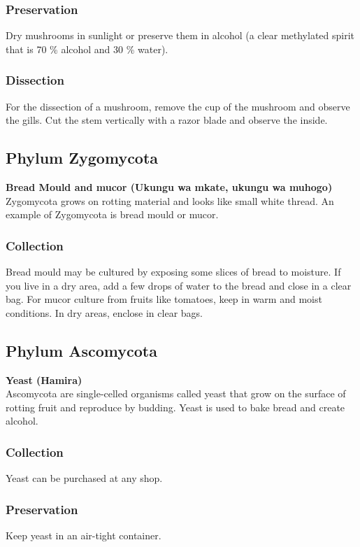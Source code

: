 \subsubsection*{Preservation} 
Dry mushrooms in sunlight or preserve them in alcohol (a clear methylated spirit that is 70 \% alcohol and 30 \% water).

\subsubsection*{Dissection}
For the dissection of a mushroom, remove the cup of the mushroom and observe the gills. Cut the stem vertically with a razor blade and observe the inside.

\subsection{Phylum Zygomycota}

\textbf{Bread Mould and mucor (Ukungu wa mkate, ukungu wa muhogo)}\\
Zygomycota grows on rotting material and looks like small white thread. An example of Zygomycota is bread mould or mucor.

\subsubsection{Collection}

Bread mould may be cultured by exposing some slices of bread to moisture. If you live in a dry area, add a few drops of water to the bread and close in a clear bag.
For mucor culture from fruits like tomatoes, keep in warm and moist conditions. In dry areas, enclose in clear bags. 

\subsection{Phylum Ascomycota}

\textbf{Yeast (Hamira)}\\
Ascomycota are single-celled organisms called yeast that grow on the surface of rotting fruit and reproduce by budding. Yeast is used to bake bread and create alcohol.

\subsubsection{Collection}
Yeast can be purchased at any shop.

\subsubsection*{Preservation} 
Keep yeast in an air-tight container.


